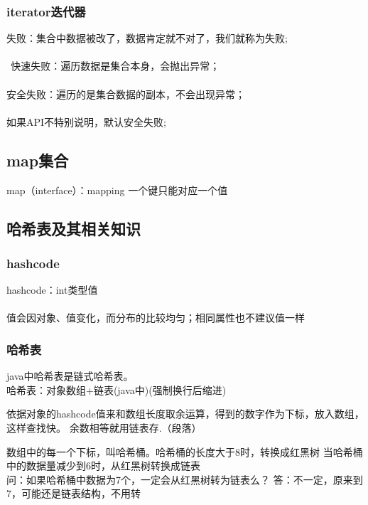 \documentclass[12pt]{ctexart}
\begin{document}
\subsubsection{iterator迭代器}
失败：集合中数据被改了，数据肯定就不对了，我们就称为失败;\paragraph{}
$\ \ $快速失败：遍历数据是集合本身，会抛出异常；\paragraph{}
\quad 安全失败：遍历的是集合数据的副本，不会出现异常；\paragraph{}
\quad 如果API不特别说明，默认安全失败;\paragraph{}
\subsection{map集合}
map（interface）：mapping
一个键只能对应一个值
\subsection{哈希表及其相关知识}
\subsubsection{hashcode}
hashcode：int类型值\paragraph{}
值会因对象、值变化，而分布的比较均匀；相同属性也不建议值一样
\subsubsection{哈希表}
java中哈希表是链式哈希表。\\
\indent 哈希表：对象数组+链表(java中)(强制换行后缩进)
\par 依据对象的hashcode值来和数组长度取余运算，得到的数字作为下标，放入数组，这样查找快。
余数相等就用链表存.（段落）
\par 数组中的每一个下标，叫哈希桶。哈希桶的长度大于8时，转换成红黑树
当哈希桶中的数据量减少到6时，从红黑树转换成链表
\\
问：如果哈希桶中数据为7个，一定会从红黑树转为链表么？
答：不一定，原来到7，可能还是链表结构，不用转
\end{document}
